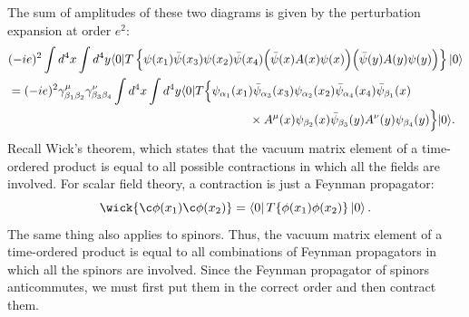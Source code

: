 \documentclass[11pt]{article}
\theoremstyle{definition}
\begin{document}
The sum of amplitudes of these two diagrams is given by the perturbation expansion at order $e^2$:
\begin{equation}
\begin{aligned}
&(-ie)^{2}\int d^{4}x\int d^{4}y\langle 0|T\left\{\psi(x_{1})\bar{\psi}(x_{3})\psi(x_{2})\bar{\psi}(x_{4})\Big{(}\bar{\psi}(x)A(x)\psi(x)\Big{)}\Big{(}\bar{\psi}(y)A(y)\psi(y)\Big{)}\right\}|0\rangle\\
&=(-ie)^{2}\gamma^{\mu}_{\beta_{1}\beta_{2}}\gamma^{\nu}_{\beta_{3}\beta_{4}}\int d^{4}x\int d^{4}y
\langle 0|T\Big{\{}\psi_{\alpha_{1}}(x_{1})\bar{\psi}_{\alpha_{3}}(x_{3})\psi_{\alpha_{2}}(x_{2})\bar{\psi}_{\alpha_{4}}(x_{4})\bar{\psi}_{\beta_{1}}(x)\\
& \qquad \qquad \qquad \qquad \qquad \qquad \qquad \qquad \qquad \qquad  \times A^{\mu}(x)\psi_{\beta_{2}}(x)\bar{\psi}_{\beta_{3}}(y)A^{\nu}(y)\psi_{\beta_{4}}(y)\Big{\}}|0\rangle.
\end{aligned}
\end{equation}
Recall Wick's theorem, which states that the vacuum matrix element of a time-ordered product is equal to all possible contractions in which all the fields are involved. For scalar field theory, a contraction is just a Feynman propagator:
\begin{equation}
    \wick{\c\phi(x_1)\c\phi(x_2)} = \bra{0}T\{\phi(x_1)\phi(x_2)\}\ket{0}.
\end{equation}
The same thing also applies to spinors. Thus, the vacuum matrix element of a time-ordered product is equal to all combinations of Feynman propagators in which all the spinors are involved. Since the Feynman propagator of spinors anticommutes, we must first put them in the correct order and then contract them. 
\end{document}
